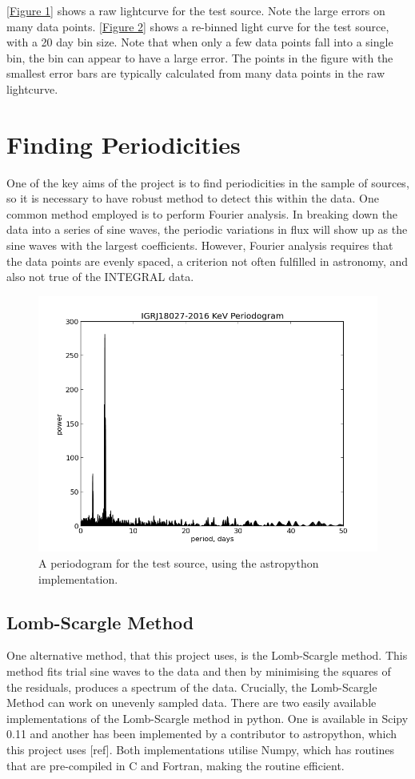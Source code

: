 \ref{Figure 1} shows a raw lightcurve for the test source. Note the large errors on many data points. 
\ref{Figure 2} shows a re-binned light curve for the test source, with a 20 day bin size. Note that when only a few data points fall into a single bin, the bin can appear to have a large error. The points in the figure with the smallest error bars are typically calculated from many data points in the raw lightcurve.

\section{Finding Periodicities}
One of the key aims of the project is to find periodicities in the sample of sources, so it is necessary to have robust method to detect this within the data. One common method employed is to perform Fourier analysis. In breaking down the data into a series of sine waves, the periodic variations in flux will show up as the sine waves with the largest coefficients. However, Fourier analysis requires that the data points are evenly spaced, a criterion not often fulfilled in astronomy, and also not true of the INTEGRAL data.

\begin{figure}[h!]
\centering
\includegraphics[width=130mm]{gfx/Fig3.png}
\caption{A periodogram for the test source, using the astropython implementation.}
\label{Figure 3}
\end{figure}

\subsection{Lomb-Scargle Method}
One alternative method, that this project uses, is the Lomb-Scargle method. This method fits trial sine waves to the data and then by minimising the squares of the residuals, produces a spectrum of the data. Crucially, the Lomb-Scargle Method can work on unevenly sampled data. 
There are two easily available implementations of the Lomb-Scargle method in python. One is available in Scipy 0.11 and another has been implemented by a contributor to astropython, which this project uses [ref]. Both implementations utilise Numpy, which has routines that are pre-compiled in C and Fortran, making the routine efficient.

